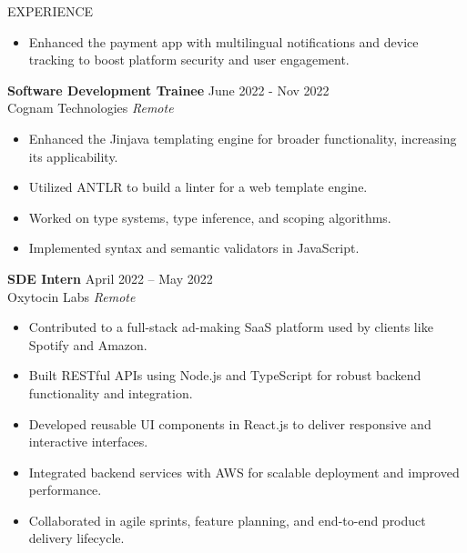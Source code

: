 \documentclass{resume}
\begin{document}
\begin{rSection}{EXPERIENCE}
\begin{itemize}
    \item Enhanced the payment app with multilingual notifications and device tracking to boost platform security and user engagement.
\end{itemize}

\textbf{Software Development Trainee} \hfill June 2022 - Nov 2022\\
Cognam Technologies \hfill \textit{Remote}
\begin{itemize}
    \itemsep-0.5em 
    \item Enhanced the Jinjava templating engine for broader functionality, increasing its applicability.
    \item Utilized ANTLR to build a linter for a web template engine.
    \item Worked on type systems, type inference, and scoping algorithms.
    \item Implemented syntax and semantic validators in JavaScript.
\end{itemize}

\textbf{SDE Intern} \hfill April 2022 – May 2022\\
Oxytocin Labs \hfill \textit{Remote}  
\begin{itemize}
    \itemsep-0.5em 
    \item Contributed to a full-stack ad-making SaaS platform used by clients like Spotify and Amazon.
    \item Built RESTful APIs using Node.js and TypeScript for robust backend functionality and integration.
    \item Developed reusable UI components in React.js to deliver responsive and interactive interfaces.
    \item Integrated backend services with AWS for scalable deployment and improved performance.
    \item Collaborated in agile sprints, feature planning, and end-to-end product delivery lifecycle.
\end{itemize}





\end{rSection}

\end{document}
